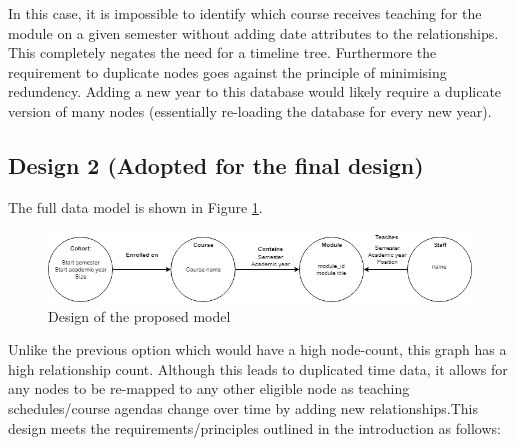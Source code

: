 \documentclass[10pt]{article}
\begin{document}
In this case, it is impossible to identify which course receives teaching for the module on a given semester without adding date attributes to the relationships. This completely negates the need for a timeline tree. Furthermore the requirement to duplicate nodes goes against the principle of minimising redundency. Adding a new year to this database would likely require a duplicate version of many nodes (essentially re-loading the database for every new year).

\subsection{Design 2 (Adopted for the final design)}

The full data model is shown in Figure \ref{modelf}.
\begin{figure}[h]
\centering
\includegraphics[scale=0.65]{full_design}
\caption{Design of the proposed model}
\label{modelf}

\end{figure}

Unlike the previous option which would have a high node-count, this graph has a high relationship count. Although this leads to duplicated time data, it allows for any nodes to be re-mapped to any other eligible node as teaching schedules/course agendas change over time by adding new relationships.This design meets the requirements/principles outlined in the introduction as follows:
\end{document}
